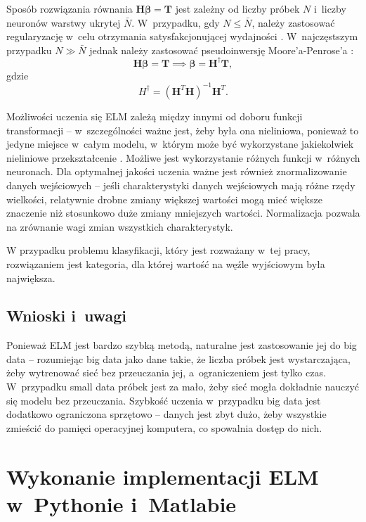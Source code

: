 \documentclass[pl]{minipw} %
\begin{document}
Sposób rozwiązania równania $\bm{H}\bm{\beta}=\bm{T}$ jest zależny od liczby próbek $N$ i~liczby neuronów warstwy ukrytej $\bar{N}$. W~przypadku, gdy $N \leq \bar{N}$, należy zastosować regularyzację w~celu otrzymania satysfakcjonującej wydajności \cite{akusok-hpelm}. W~najczęstszym przypadku $N \gg \bar{N}$ jednak należy zastosować pseudoinwersję Moore'a-Penrose'a \cite{huang-elm-base}:
\begin{equation}
\bm{H}\bm{\beta}=\bm{T} \implies \bm{\beta}=\bm{H}^{\dagger}\bm{T},
\end{equation}
gdzie 
\begin{equation}
{H}^{\dagger} = (\bm{H}^T \bm{H})^{-1}\bm{H}^T.
\end{equation}

Możliwości uczenia się ELM zależą między innymi od doboru funkcji transformacji -- w~szczególności ważne jest, żeby była ona nieliniowa, ponieważ to jedyne miejsce w~całym modelu, w~którym może być wykorzystane jakiekolwiek nieliniowe przekształcenie \cite{akusok-hpelm}. Możliwe jest wykorzystanie różnych funkcji w~różnych neuronach. Dla optymalnej jakości uczenia ważne jest również znormalizowanie danych wejściowych -- jeśli charakterystyki danych wejściowych mają różne rzędy wielkości, relatywnie drobne zmiany większej wartości mogą mieć większe znaczenie niż stosunkowo duże zmiany mniejszych wartości. Normalizacja pozwala na zrównanie wagi zmian wszystkich charakterystyk. \par

W przypadku problemu klasyfikacji, który jest rozważany w~tej pracy, rozwiązaniem jest kategoria, dla której wartość na węźle wyjściowym była największa. 
\section{Wnioski i~uwagi}
Ponieważ ELM jest bardzo szybką metodą, naturalne jest zastosowanie jej do big data -- rozumiejąc big data jako dane takie, że liczba próbek jest wystarczająca, żeby wytrenować sieć bez przeuczania jej, a~ograniczeniem jest tylko czas. W~przypadku small data próbek jest za mało, żeby sieć mogła dokładnie nauczyć się modelu bez przeuczania. Szybkość uczenia w~przypadku big data jest dodatkowo ograniczona sprzętowo -- danych jest zbyt dużo, żeby wszystkie zmieścić do pamięci operacyjnej komputera, co spowalnia dostęp do nich.
\label{wnioski1}
\clearpage
\chapter{Wykonanie implementacji ELM w~Pythonie i~Matlabie}
\end{document}
